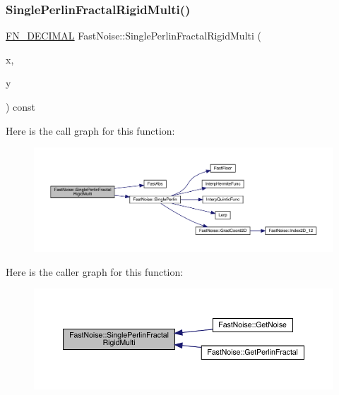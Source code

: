 \subsubsection{\texorpdfstring{Single\+Perlin\+Fractal\+Rigid\+Multi()}{SinglePerlinFractalRigidMulti()}\hspace{0.1cm}{\footnotesize\ttfamily [1/2]}}
{\footnotesize\ttfamily \mbox{\hyperlink{_fast_noise_8h_a75a9ef6d2541c4921815b885bfd449c3}{F\+N\+\_\+\+D\+E\+C\+I\+M\+AL}} Fast\+Noise\+::\+Single\+Perlin\+Fractal\+Rigid\+Multi (\begin{DoxyParamCaption}\item[{\mbox{\hyperlink{_fast_noise_8h_a75a9ef6d2541c4921815b885bfd449c3}{F\+N\+\_\+\+D\+E\+C\+I\+M\+AL}}}]{x,  }\item[{\mbox{\hyperlink{_fast_noise_8h_a75a9ef6d2541c4921815b885bfd449c3}{F\+N\+\_\+\+D\+E\+C\+I\+M\+AL}}}]{y }\end{DoxyParamCaption}) const\hspace{0.3cm}{\ttfamily [private]}}

Here is the call graph for this function\+:
\nopagebreak
\begin{figure}[H]
\begin{center}
\leavevmode
\includegraphics[width=350pt]{d1/dd8/class_fast_noise_a20d9ce6e0bd7730ac242e7de5fda0541_cgraph}
\end{center}
\end{figure}
Here is the caller graph for this function\+:
\nopagebreak
\begin{figure}[H]
\begin{center}
\leavevmode
\includegraphics[width=350pt]{d1/dd8/class_fast_noise_a20d9ce6e0bd7730ac242e7de5fda0541_icgraph}
\end{center}
\end{figure}
\mbox{\label{class_fast_noise_ad5d0bbafb8bc1e07c3d771455736600d}} 
